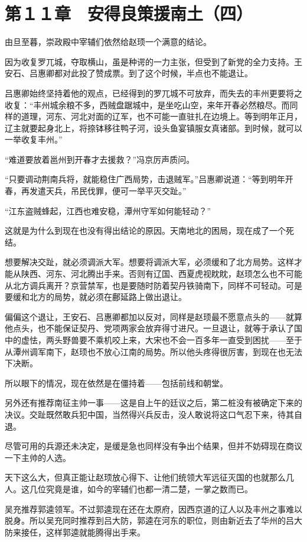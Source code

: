 \section{第１１章　安得良策援南土（四）}

由旦至暮，崇政殿中宰辅们依然给赵顼一个满意的结论。

因为收复罗兀城，夺取横山，虽是种谔的一力主张，但受到了新党的全力支持。王安石、吕惠卿都对此投了赞成票。到了这个时候，半点也不能退让。

吕惠卿始终坚持着他的观点，已经得到的罗兀城不可放弃，而失去的丰州更要将之收复：“丰州城余粮不多，西贼盘踞城中，是坐吃山空，来年开春必然粮尽。而同样的道理，河东、河北对面的辽军，也不可能一直驻扎在边境上。等到明年正月，辽主就要起身北上，将捺钵移往鸭子河，设头鱼宴镇服女真诸部。到时候，就可以一举收复丰州。”

“难道要放着邕州到开春才去援救？”冯京厉声质问。

“只要调动荆南兵将，就能稳住广西局势，击退贼军。”吕惠卿说道：“等到明年开春，再发遣天兵，吊民伐罪，便可一举平灭交趾。”

“江东盗贼蜂起，江西也难安稳，潭州守军如何能轻动？”

这就是为什么到现在也没有得出结论的原因。天南地北的困局，现在成了一个死结。

想要解决交趾，就必须调派大军。想要将调派大军，必须缓和了北方局势。这样才能从陕西、河东、河北腾出手来。否则有辽国、西夏虎视眈眈，赵顼怎么也不可能从北方调兵离开？京营禁军，也是要随时防着契丹铁骑南下，同样不可轻动。可是要缓和北方的局势，就必须在鄜延路上做出退让。

偏偏这个退让，王安石、吕惠卿都加以反对，同样是赵顼最不愿意点头的——就算他点头，也不能保证契丹、党项两家会放弃得寸进尺。一旦退让，就等于承认了国中的虚怯，两头野兽要不乘机咬上来，大宋也不会一百多年一直受到困扰——至于从潭州调军南下，赵顼也不放心江南的局势。所以他头疼得很厉害，到现在也无法下决断。

所以眼下的情况，现在依然是在僵持着——包括前线和朝堂。

另外还有推荐南征主帅一事——这是自上午的廷议之后，第二桩没有被确定下来的决议。交趾既然敢兵犯中国，当然得兴兵反击，没人敢说将这口气忍下来，待其自退。

尽管可用的兵源还未决定，是缓是急也同样没有争出个结果，但并不妨碍现在商议一下主帅的人选。

天下这么大，但真正能让赵顼放心得下、让他们统领大军远征灭国的也就那么几人。这几位究竟是谁，如今的宰辅们也都一清二楚，一掌之数而已。

吴充推荐郭逵领军。不过郭逵现在还在太原府，因西京道的辽人以及丰州之事难以脱身。所以吴充同时推荐到吕大防，郭逵在河东的职位，则由新近去了华州的吕大防来接任，这样郭逵就能腾得出手来。

